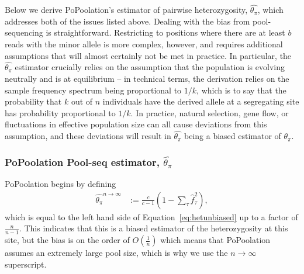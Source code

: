 \documentclass[a4paper,fontsize=9pt,DIV=14]{scrartcl}
\newcommand{\samplesize}{n}
\newcommand{\coverage}{c}
\newcommand{\empfreq}{\widehat{f}}
\newcommand{\thetapi}{\widehat{\theta_\pi}}
\begin{document}
Below we derive PoPoolation's estimator of pairwise heterozygosity, $\thetapi$, which addresses both of the issues listed above.  Dealing with the bias from pool-sequencing is straightforward.  Restricting to positions where there are at least $b$ reads with the minor allele is more complex, however, and requires additional assumptions that will almost certainly not be met in practice.  In particular, the $\thetapi$ estimator crucially relies on the assumption that the population is evolving neutrally and is at equilibrium -- in technical terms, the derivation relies on the sample frequency spectrum being proportional to $1/k$, which is to say that the probability that $k$ out of $\samplesize$ individuals have the derived allele at a segregating site has probability proportional to $1/k$.  In practice, natural selection, gene flow, or fluctuations in effective population size can all cause deviations from this assumption, and these deviations will result in $\thetapi$ being a biased estimator of $\theta_\pi$.



\subsubsection*{PoPoolation Pool-seq estimator, $\thetapi$}
\label{supp:sec:ThetaPi:sub:PoolSequencing}

%

PoPoolation begins by defining %
\begin{align}
    \label{eq:ThetaPiFreq2}
    \thetapi^{\samplesize\to\infty} &:= \frac{\coverage}{\coverage-1} \left(1 - \sum_\tau \empfreq_\tau^2 \right),
\end{align}
%
which is equal to the left hand side of Equation~\ref{eq:hetunbiased} up to a factor of $\frac{\samplesize}{\samplesize-1}$.  This indicates that this is a biased estimator of the heterozygosity at this site, but the bias is on the order of $O\left(\frac{1}{\samplesize}\right)$ which means that PoPoolation assumes an extremely large pool size, which is why we use the $\samplesize\to\infty$ superscript.
\end{document}
